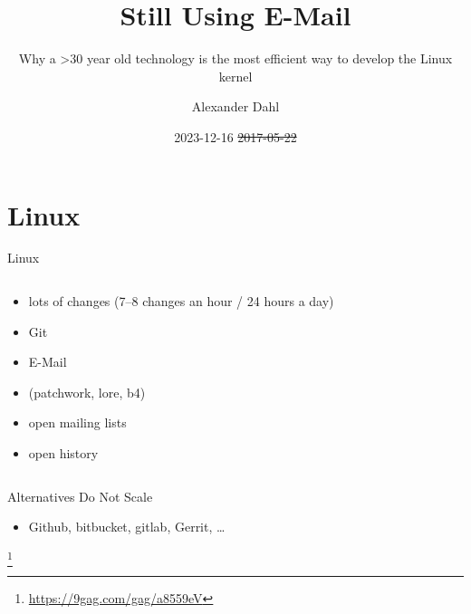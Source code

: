 \documentclass{beamer}
\title{Still Using E-Mail}
\subtitle{Why a >30 year old technology is the most efficient way to develop the Linux kernel}
\author{Alexander Dahl}
\institute[lespocky.de]{\url{http://www.lespocky.de/}}
\date{2023-12-16 \sout{2017-05-22}}
\begin{document}
\begin{frame}
	\titlepage
\end{frame}

%    

\section{Linux}

\begin{frame}{Linux}
    \begin{columns}[T]
        \begin{column}{0.6\textwidth}
            \begin{itemize}
                \item lots of changes (7--8 changes an hour / 24 hours a day)
                \item Git
                \item E-Mail
                \item (patchwork, lore, b4)
                \item open mailing lists
                \item open history
            \end{itemize}
        \end{column}
        \begin{column}{0.4\textwidth}
            
        \end{column}
    \end{columns}
\end{frame}

\begin{frame}{Alternatives Do Not Scale}
    \begin{itemize}
        \item Github, bitbucket, gitlab, Gerrit, …
    \end{itemize}
    \footnote{\tiny\url{https://9gag.com/gag/a8559eV}}
\end{frame}
\end{document}
